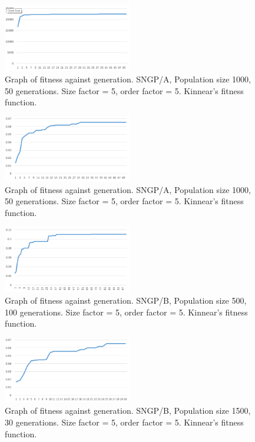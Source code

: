 \documentclass{article}
\begin{document}
    	\begin{figure}[H]
    		\centering
    		\includegraphics[width=0.5\textwidth]{g_sngpA_kinnear}
    		\caption{Graph of fitness against generation. SNGP/A, Population size 1000, 50 generations. Size factor = 5, order factor = 5. Kinnear's fitness function.}
    		\label{g:sngpa_kinnear}
    	\end{figure}
    
    	\begin{figure}[H]
    		\centering
    		\includegraphics[width=0.5\textwidth]{g_sngpb_kinnear}
    		\caption{Graph of fitness against generation. SNGP/A, Population size 1000, 50 generations. Size factor = 5, order factor = 5. Kinnear's fitness function.}
    		\label{g:sngpb_kinnear}
    	\end{figure}
    
	    \begin{figure}[H]
	    	\centering
	    	\includegraphics[width=0.5\textwidth]{g_sngpb_kinnear_p500_o100}
	    	\caption{Graph of fitness against generation. SNGP/B, Population size 500, 100 generations. Size factor = 5, order factor = 5. Kinnear's fitness function.}
	    	\label{g:sngpb_kinnear_p500}
	    \end{figure}
    
    	\begin{figure}[H]
    		\centering
    		\includegraphics[width=0.5\textwidth]{g_sngpb_kinnear_p1500_o30}
    		\caption{Graph of fitness against generation. SNGP/B, Population size 1500, 30 generations. Size factor = 5, order factor = 5. Kinnear's fitness function.}
    		\label{g:sngpb_kinnear_p1500}
    	\end{figure}
    
\end{document}
